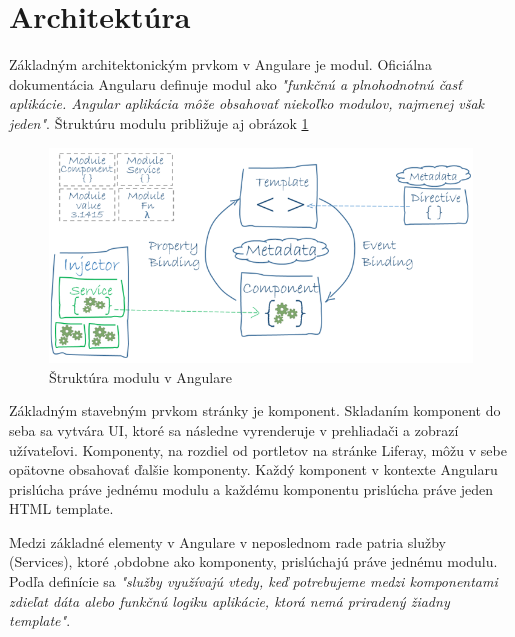 \documentclass[
  digital, %
  twoside, %
  notable,   %
  nolof,   %
  nolot,   %
]{fithesis3}
\begin{document}
\section{Architektúra}
Základným architektonickým prvkom v Angulare je modul. Oficiálna dokumentácia Angularu definuje modul ako \textit{"funkčnú a plnohodnotnú časť aplikácie. Angular aplikácia môže obsahovať niekoľko modulov, najmenej však jeden"}\cite{angular}. Štruktúru modulu približuje aj obrázok \ref{angular_architecture}

\begin{figure}[H]
	\center
	\includegraphics[width=1.0\linewidth]{angular_architecture}
	\caption{Štruktúra modulu v Angulare\cite{angular}}
	\label{angular_architecture}
\end{figure}

Základným stavebným prvkom stránky je komponent. Skladaním komponent do seba sa vytvára UI, ktoré sa následne vyrenderuje v prehliadači a zobrazí užívateľovi. Komponenty, na rozdiel od portletov na stránke Liferay, môžu v sebe opätovne obsahovať ďalšie komponenty. Každý komponent v kontexte Angularu prislúcha práve jednému modulu a každému komponentu prislúcha práve jeden HTML template.

Medzi základné elementy v Angulare v neposlednom rade patria služby (Services), ktoré ,obdobne ako komponenty, prislúchajú práve jednému modulu. Podľa definície sa \textit{"služby využívajú vtedy, keď potrebujeme medzi komponentami zdieľat dáta alebo funkčnú logiku aplikácie, ktorá nemá priradený žiadny template"}\cite{angular}.
\end{document}
